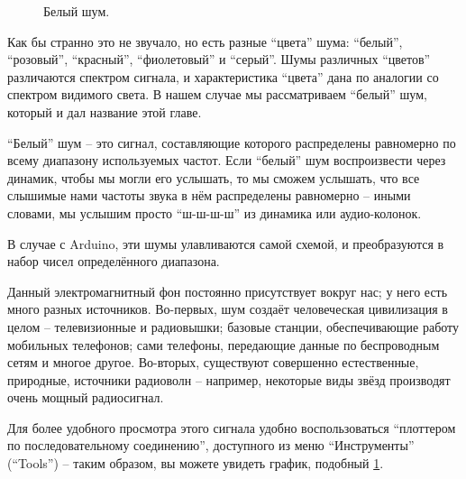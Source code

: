 \documentclass[../sparc.tex]{subfiles}
\begin{document}
\begin{figure}[ht]
  \centering
  \caption{Белый шум.}
  \label{fig:white-noize}
\end{figure}

Как бы странно это не звучало, но есть разные ``цвета'' шума: ``белый'',
``розовый'', ``красный'', ``фиолетовый'' и ``серый''.  Шумы различных ``цветов''
различаются спектром сигнала, и характеристика ``цвета'' дана по аналогии со
спектром видимого света.  В нашем случае мы рассматриваем ``белый'' шум, который
и дал название этой главе.

``Белый'' шум -- это сигнал, составляющие которого распределены равномерно по
всему диапазону используемых частот.  Если ``белый'' шум воспроизвести через
динамик, чтобы мы могли его услышать, то мы сможем услышать, что все слышимые
нами частоты звука в нём распределены равномерно -- иными словами, мы услышим
просто ``ш-ш-ш-ш'' из динамика или аудио-колонок.


В случае с Arduino, эти шумы улавливаются самой схемой, и преобразуются в набор
чисел определённого диапазона.

Данный электромагнитный фон постоянно присутствует вокруг нас; у него есть много
разных источников.  Во-первых, шум создаёт человеческая цивилизация в целом --
телевизионные и радиовышки; базовые станции, обеспечивающие работу мобильных
телефонов; сами телефоны, передающие данные по беспроводным сетям и многое
другое.  Во-вторых, существуют совершенно естественные, природные, источники
радиоволн -- например, некоторые виды звёзд производят очень мощный радиосигнал.

Для более удобного просмотра этого сигнала удобно воспользоваться ``плоттером по
последовательному соединению'', доступного из меню ``Инструменты'' (``Tools'') --
таким образом, вы можете увидеть график, подобный \ref{fig:white-noize}.
\end{document}
